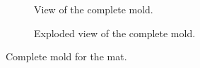 \begin{figure}
    \centering
    \begin{subfigure}[b]{0.475\textwidth}
        \centering
        \caption{View of the complete mold.}
        \label{fig: mat_v1}
    \end{subfigure}
    \hfill
    \begin{subfigure}[b]{0.475\textwidth}
        \centering
        \caption{Exploded view of the complete mold.}
        \label{fig: mold_v1}
    \end{subfigure}
    \caption{Complete mold for the mat.}
\end{figure}